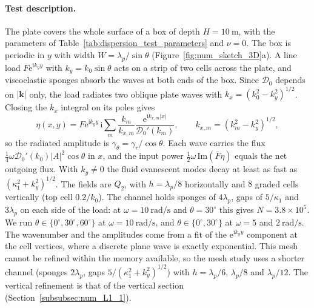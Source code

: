 {\paragraph{Test description.} The plate covers the whole surface of a box of depth $H=10~\si{\meter}$, with the parameters of Table~\ref{tab:dispersion_test_parameters} and $\nu=0$. The box is periodic in $y$ with width $W=\lambda_p/\sin\theta$ (Figure~\ref{fig:num_sketch_3D}a). A line load $F\mathrm{e}^{\mathrm{i}k_yy}$ with $k_y=k_0\sin\theta$ acts on a strip of two cells across the plate, and viscoelastic sponges absorb the waves at both ends of the box. Since $\mathcal{D}_0$ depends on $|\boldsymbol{k}|$ only, the load radiates two oblique plate waves with $k_x=(k_0^2-k_y^2)^{1/2}$. Closing the $k_x$ integral on its poles gives
\begin{equation}
    \eta(x,y)=F\mathrm{e}^{\mathrm{i}k_yy}\,\mathrm{i}\sum_m\frac{k_m}{k_{x,m}}\frac{\mathrm{e}^{\mathrm{i}k_{x,m}|x|}}{\mathcal{D}_0'(k_m)},\qquad k_{x,m}=(k_m^2-k_y^2)^{1/2},
\end{equation}
so the radiated amplitude is $\gamma_\theta=\gamma_r/\cos\theta$. Each wave carries the flux $\tfrac14\omega\mathcal{D}_0'(k_0)|A|^2\cos\theta$ in $x$, and the input power $\tfrac12\omega\,\mathrm{Im}(\bar F\eta)$ equals the net outgoing flux. With $k_y\neq0$ the fluid evanescent modes decay at least as fast as $(\kappa_1^2+k_y^2)^{1/2}$. The fields are $Q_2$, with $h=\lambda_p/8$ horizontally and $8$ graded cells vertically (top cell $0.2/k_0$). The channel holds sponges of $4\lambda_p$, gaps of $5/\kappa_1$ and $3\lambda_p$ on each side of the load: at $\omega=10~\si{\radian\per\second}$ and $\theta=30^\circ$ this gives $N=3.8\times10^5$. We run $\theta\in\{0^\circ,30^\circ,60^\circ\}$ at $\omega=10~\si{\radian\per\second}$, and $\theta\in\{0^\circ,30^\circ\}$ at $\omega=5$ and $2~\si{\radian\per\second}$. The wavenumber and the amplitudes come from a fit of the $\mathrm{e}^{\mathrm{i}k_yy}$ component at the cell vertices, where a discrete plane wave is exactly exponential. This mesh cannot be refined within the memory available, so the mesh study uses a shorter channel (sponges $2\lambda_p$, gaps $5/(\kappa_1^2+k_y^2)^{1/2}$) with $h=\lambda_p/6$, $\lambda_p/8$ and $\lambda_p/12$. The vertical refinement is that of the vertical section (Section~\ref{subsubsec:num_L1_1}).

}
